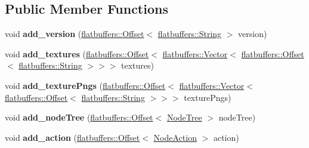 \subsection*{Public Member Functions}
\begin{DoxyCompactItemize}
\item 
\mbox{\label{structflatbuffers_1_1CSParseBinaryBuilder_aa8f096e06fbab46ae5d17978b838670c}} 
void {\bfseries add\+\_\+version} (\hyperlink{structflatbuffers_1_1Offset}{flatbuffers\+::\+Offset}$<$ \hyperlink{structflatbuffers_1_1String}{flatbuffers\+::\+String} $>$ version)
\item 
\mbox{\label{structflatbuffers_1_1CSParseBinaryBuilder_ac0f3c91662fef37c96cb4610a1391cc8}} 
void {\bfseries add\+\_\+textures} (\hyperlink{structflatbuffers_1_1Offset}{flatbuffers\+::\+Offset}$<$ \hyperlink{classflatbuffers_1_1Vector}{flatbuffers\+::\+Vector}$<$ \hyperlink{structflatbuffers_1_1Offset}{flatbuffers\+::\+Offset}$<$ \hyperlink{structflatbuffers_1_1String}{flatbuffers\+::\+String} $>$$>$$>$ textures)
\item 
\mbox{\label{structflatbuffers_1_1CSParseBinaryBuilder_af1637bf9694c6fd6ff59b0846c159d6e}} 
void {\bfseries add\+\_\+texture\+Pngs} (\hyperlink{structflatbuffers_1_1Offset}{flatbuffers\+::\+Offset}$<$ \hyperlink{classflatbuffers_1_1Vector}{flatbuffers\+::\+Vector}$<$ \hyperlink{structflatbuffers_1_1Offset}{flatbuffers\+::\+Offset}$<$ \hyperlink{structflatbuffers_1_1String}{flatbuffers\+::\+String} $>$$>$$>$ texture\+Pngs)
\item 
\mbox{\label{structflatbuffers_1_1CSParseBinaryBuilder_a43f0f3a7860fdee5eb9c5d08cc886ff7}} 
void {\bfseries add\+\_\+node\+Tree} (\hyperlink{structflatbuffers_1_1Offset}{flatbuffers\+::\+Offset}$<$ \hyperlink{structflatbuffers_1_1NodeTree}{Node\+Tree} $>$ node\+Tree)
\item 
\mbox{\label{structflatbuffers_1_1CSParseBinaryBuilder_af4f02ba965cdbf953d010eba80ddf6ea}} 
void {\bfseries add\+\_\+action} (\hyperlink{structflatbuffers_1_1Offset}{flatbuffers\+::\+Offset}$<$ \hyperlink{structflatbuffers_1_1NodeAction}{Node\+Action} $>$ action)
\item 

\end{DoxyCompactItemize}
